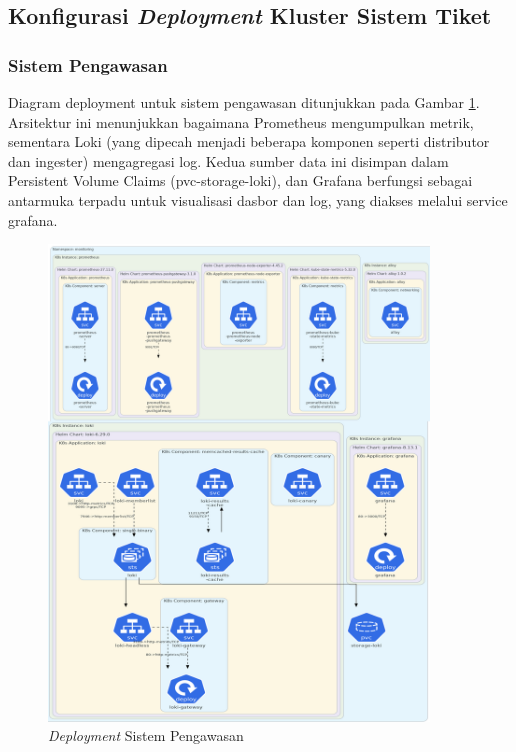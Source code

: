 \subsection{Konfigurasi \textit{Deployment} Kluster Sistem Tiket}

\subsubsection{Sistem Pengawasan}

Diagram deployment untuk sistem pengawasan ditunjukkan pada Gambar \ref{fig:deployment-monitoring}. Arsitektur ini menunjukkan bagaimana Prometheus mengumpulkan metrik, sementara Loki (yang dipecah menjadi beberapa komponen seperti distributor dan ingester) mengagregasi log. Kedua sumber data ini disimpan dalam Persistent Volume Claims (pvc-storage-loki), dan Grafana berfungsi sebagai antarmuka terpadu untuk visualisasi dasbor dan log, yang diakses melalui service grafana.

\begin{figure}[H]
    \centering
    \includegraphics[width=0.9\textwidth]{resources/chapter-4/monitoring-1.png}
    \caption{\textit{Deployment} Sistem Pengawasan}
    \label{fig:deployment-monitoring}
\end{figure}

